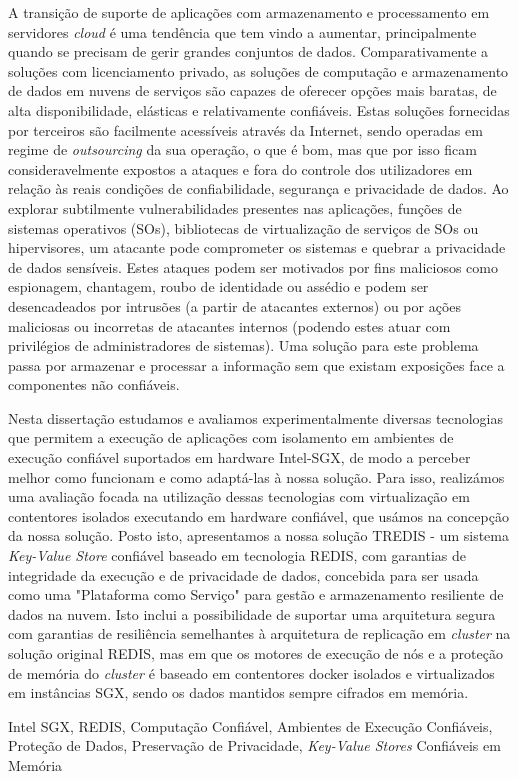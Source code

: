 A transição de suporte de aplicações com armazenamento e processamento em servidores \textit{cloud} é uma tendência que tem vindo a aumentar, principalmente quando se precisam de gerir grandes conjuntos de dados. Comparativamente a soluções com licenciamento privado, as soluções de computação e armazenamento de dados em nuvens de serviços são capazes de oferecer opções mais baratas, de alta disponibilidade, elásticas e relativamente confiáveis. Estas soluções fornecidas por terceiros são facilmente acessíveis através da Internet, sendo operadas em regime de \textit{outsourcing} da sua operação, o que é bom, mas que por isso ficam consideravelmente expostos a ataques e fora do controle dos utilizadores em relação às reais condições de confiabilidade, segurança e privacidade de dados. Ao explorar subtilmente vulnerabilidades presentes nas aplicações, funções de sistemas operativos (SOs), bibliotecas de virtualização de serviços de SOs ou hipervisores, um atacante pode comprometer os sistemas e quebrar a privacidade de dados sensíveis. Estes ataques podem ser motivados por fins maliciosos como espionagem, chantagem, roubo de identidade ou assédio e podem ser desencadeados por intrusões (a partir de atacantes externos) ou por ações maliciosas ou incorretas de atacantes internos (podendo estes atuar com privilégios de administradores de sistemas). Uma solução para este problema passa por armazenar e processar a informação sem que existam exposições face a componentes não confiáveis. 

Nesta dissertação estudamos e avaliamos experimentalmente diversas tecnologias que permitem a execução de aplicações com isolamento em ambientes de execução confiável suportados em hardware Intel-SGX, de modo a perceber melhor como funcionam e como adaptá-las à nossa solução. Para isso, realizámos uma avaliação focada na utilização dessas tecnologias com virtualização em contentores isolados executando em hardware confiável, que usámos na concepção da nossa solução. Posto isto, apresentamos a nossa solução TREDIS - um sistema \textit{Key-Value Store} confiável baseado em tecnologia REDIS, com garantias de integridade da execução e de privacidade de dados, concebida para ser usada como uma "Plataforma como Serviço" para gestão e armazenamento resiliente de dados na nuvem. Isto inclui a possibilidade de suportar uma arquitetura segura com garantias de resiliência semelhantes à arquitetura de replicação em \textit{cluster} na solução original REDIS, mas em que os motores de execução de nós e a proteção de memória do \textit{cluster} é baseado em contentores docker isolados e virtualizados em instâncias SGX, sendo os dados mantidos sempre cifrados em memória.
	
\begin{keywords}
 Intel SGX, REDIS, Computação Confiável, Ambientes de Execução Confiáveis, Proteção de Dados, Preservação de Privacidade, \textit{Key-Value Stores} Confiáveis em Memória
\end{keywords}


	
